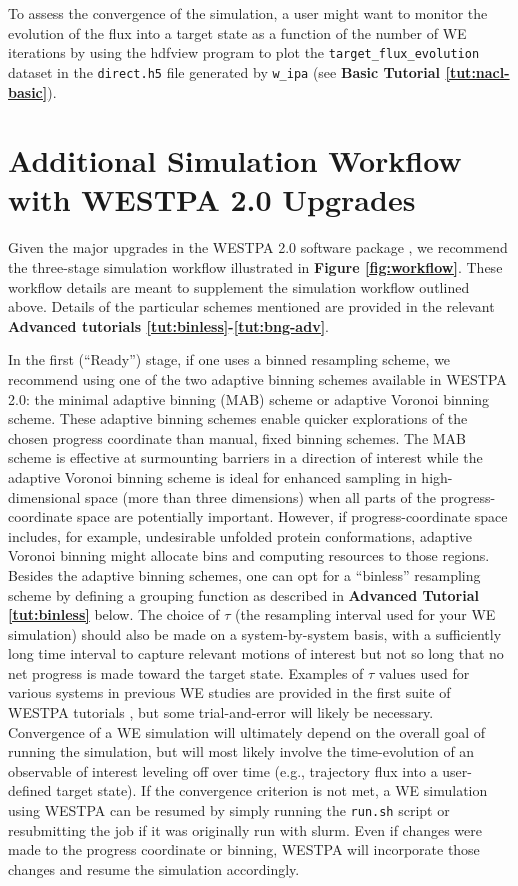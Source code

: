 To assess the convergence of the simulation, a user might want to monitor the evolution of the flux into a target state as a function of the number of WE iterations by using the hdfview program to plot the \verb|target_flux_evolution| dataset in the \verb|direct.h5| file generated by \verb|w_ipa| (see \textbf{Basic Tutorial \ref{tut:nacl-basic}}). 

\section{Additional Simulation Workflow with WESTPA 2.0 Upgrades}

Given the major upgrades in the WESTPA 2.0 software package \citep{russo_westpa_2022}, we recommend the three-stage simulation workflow illustrated in \textbf{Figure \ref{fig:workflow}}. 
These workflow details are meant to supplement the simulation workflow outlined above. 
Details of the particular schemes mentioned are provided in the relevant \textbf{Advanced tutorials \ref{tut:binless}-\ref{tut:bng-adv}}.

In the first (“Ready”) stage, if one uses a binned resampling scheme, we recommend using one of the two adaptive binning schemes available in WESTPA 2.0: the minimal adaptive binning (MAB) scheme or adaptive Voronoi binning scheme.
These adaptive binning schemes enable quicker explorations of the chosen progress coordinate than manual, fixed binning schemes. 
The MAB scheme is effective at surmounting barriers in a direction of interest \citep{torrillo_minimal_2021} while the adaptive Voronoi binning scheme \citep{zhang_exact_2010} is ideal for enhanced sampling in high-dimensional space (more than three dimensions) when all parts of the progress-coordinate space are potentially important. 
However, if progress-coordinate space includes, for example, undesirable unfolded protein conformations, adaptive Voronoi binning might allocate bins and computing resources to those regions. 
Besides the adaptive binning schemes, one can opt for a “binless” resampling scheme by defining a grouping function as described in \textbf{Advanced Tutorial \ref{tut:binless}} below. 
The choice of $\tau$ (the resampling interval used for your WE simulation) should also be made on a system-by-system basis, with a sufficiently long time interval to capture relevant motions of interest but not so long that no net progress is made toward the target state. 
Examples of $\tau$ values used for various systems in previous WE studies are provided in the first suite of WESTPA tutorials \citep{bogetti_suite_2019}, but some trial-and-error will likely be necessary.
Convergence of a WE simulation will ultimately depend on the overall goal of running the simulation, but will most likely involve the time-evolution of an observable of interest leveling off over time (e.g., trajectory flux into a user-defined target state). 
If the convergence criterion is not met, a WE simulation using WESTPA can be resumed by simply running the \verb|run.sh| script or resubmitting the job if it was originally run with slurm. 
Even if changes were made to the progress coordinate or binning, WESTPA will incorporate those changes and resume the simulation accordingly.


